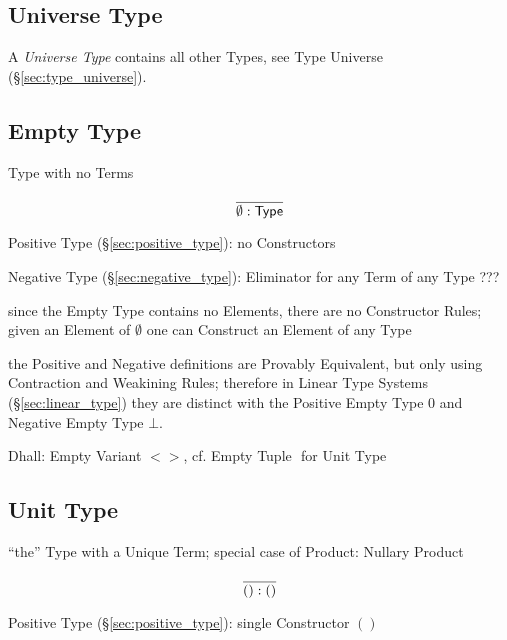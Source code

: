 \subsection{Universe Type}\label{sec:universe_type}

A \emph{Universe Type} contains all other Types, see Type Universe
(\S\ref{sec:type_universe}).



\subsection{Empty Type}\label{sec:empty_type}

Type with no Terms

\[
  \frac{}
  {\emptyset:\mathsf{Type}}
\]


Positive Type (\S\ref{sec:positive_type}): no Constructors

Negative Type (\S\ref{sec:negative_type}): Eliminator for any Term of
any Type ???

since the Empty Type contains no Elements, there are no Constructor
Rules; given an Element of $\emptyset$ one can Construct an Element of
any Type

the Positive and Negative definitions are Provably Equivalent, but
only using Contraction and Weakining Rules; therefore in Linear Type
Systems (\S\ref{sec:linear_type}) they are distinct with the Positive
Empty Type $0$ and Negative Empty Type $\bot$.

Dhall: Empty Variant $<>$, cf. Empty Tuple ${}$ for Unit Type



\subsection{Unit Type}\label{sec:unit_type}

``the'' Type with a Unique Term; special case of Product: Nullary
Product

\[
  \frac{}
  {():\mathsf{()}}
\]

Positive Type (\S\ref{sec:positive_type}): single Constructor $()$

